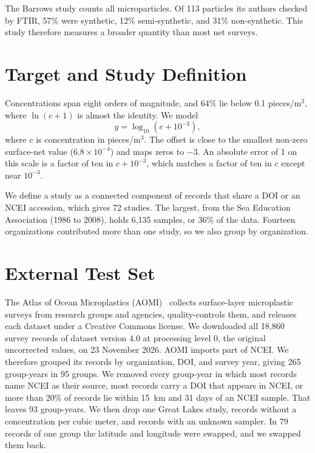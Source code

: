 \documentclass[12pt,a4paper]{report}
\begin{document}
The Barrows study counts all microparticles. Of 113 particles its authors checked by FTIR, 57\% were synthetic, 12\% semi-synthetic, and 31\% non-synthetic. This study therefore measures a broader quantity than most net surveys.

\section{Target and Study Definition}

Concentrations span eight orders of magnitude, and 64\% lie below 0.1 pieces/m$^3$, where $\ln(c+1)$ is almost the identity. We model
\begin{equation}
y=\log_{10}(c+10^{-3}),
\end{equation}
where $c$ is concentration in pieces/m$^3$. The offset is close to the smallest non-zero surface-net value ($6.8\times10^{-4}$) and maps zeros to $-3$. An absolute error of 1 on this scale is a factor of ten in $c+10^{-3}$, which matches a factor of ten in $c$ except near $10^{-3}$.

We define a study as a connected component of records that share a DOI or an NCEI accession, which gives 72 studies. The largest, from the Sea Education Association (1986 to 2008), holds 6,135 samples, or 36\% of the data. Fourteen organizations contributed more than one study, so we also group by organization.

\section{External Test Set}

The Atlas of Ocean Microplastics (AOMI)~\cite{aomi,isobe2021} collects surface-layer microplastic surveys from research groups and agencies, quality-controls them, and releases each dataset under a Creative Commons license. We downloaded all 18,860 survey records of dataset version 4.0 at processing level 0, the original uncorrected values, on 23 November 2026. AOMI imports part of NCEI. We therefore grouped its records by organization, DOI, and survey year, giving 265 group-years in 95 groups. We removed every group-year in which most records name NCEI as their source, most records carry a DOI that appears in NCEI, or more than 20\% of records lie within 15~km and 31 days of an NCEI sample. That leaves 93 group-years. We then drop one Great Lakes study, records without a concentration per cubic meter, and records with an unknown sampler. In 79 records of one group the latitude and longitude were swapped, and we swapped them back.
\end{document}
